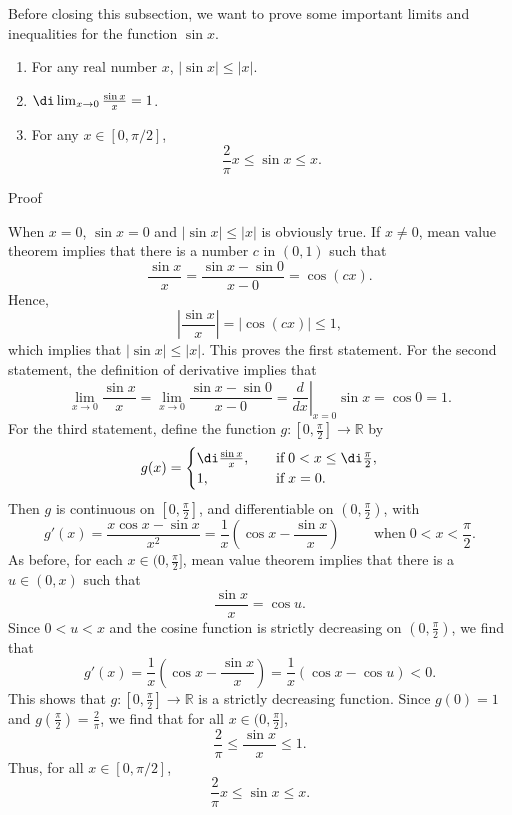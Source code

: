 Before closing this subsection, we want to prove some important limits and  inequalities for the function $\sin x$.
\begin{theorem}[label=230307_8]{}
\begin{enumerate}[1.]
\item
For any real number $x$, $|\sin x|\leq |x|$.
\item $\di \lim_{x\to 0}\frac{\sin x}{x}=1$.
\item For any $x\in [0, \pi/2]$, 
\[\frac{2}{\pi}x\leq \sin x \leq x.\]
\end{enumerate}
\end{theorem}
\begin{myproof}{Proof}
 
When $x=0$, $\sin x=0$ and $|\sin x|\leq |x|$ is obviously true. If $x\neq 0$, mean value theorem implies that there is a number $c$ in $(0,1)$ such that
\begin{equation}\label{eq230218_9}\frac{\sin x}{x}=\frac{\sin x-\sin 0}{x-0}=\cos (cx).\end{equation}
Hence, \[\left|\frac{\sin x}{x}\right|=|\cos (cx)|\leq 1,\]which implies that $|\sin x|\leq |x|$. This proves the first statement.\bp
For the second statement, the definition of derivative implies that
\begin{equation*}\lim_{x\to 0}\frac{\sin x}{x}=\lim_{x\to 0}\frac{\sin x-\sin 0}{x-0}=\left.\frac{d}{dx}\right|_{x=0}\sin x=\cos 0=1.\end{equation*}
  For the third statement, define the function $g:[0,\frac{\pi}{2}]\to\mathbb{R}$ by
\[g(x)=\begin{cases}\di\frac{\sin x}{x},\quad &\text{if}\;0<x\leq\di\frac{\pi}{2},\\1,\quad &\text{if}\;x=0.\end{cases}\]Then $g$ is continuous on $[0, \frac{\pi}{2}]$, and differentiable on $(0, \frac{\pi}{2})$, with
\[g'(x)=\frac{x\cos x-\sin x}{x^2}=\frac{1}{x}\left(\cos x-\frac{\sin x}{x}\right)\hspace{1cm}\text{when}\;0<x<\frac{\pi}{2}.\]
As before, for each $x\in (0, \frac{\pi}{2}]$, mean value theorem implies that there is a $u\in (0, x)$ such that
\[\frac{\sin x}{x}=\cos u.\]
Since $0<u<x$ and the cosine function is strictly decreasing on $(0, \frac{\pi}{2})$, we find that
\[g'(x)=\frac{1}{x}\left(\cos x-\frac{\sin x}{x}\right)=\frac{1}{x}\left(\cos x-\cos u\right)<0.\]
This shows that $g:[0,\frac{\pi}{2}]\to\mathbb{R}$ is a strictly decreasing function. Since $g(0)=1$ and $g(\frac{\pi}{2})=\frac{2}{\pi}$, we find that for all $x\in (0, \frac{\pi}{2}]$,
\[\frac{2}{\pi}\leq\frac{\sin x}{x}\leq 1.\]
Thus, for all $x\in [0, \pi/2]$, 
\[\frac{2}{\pi}x\leq \sin x \leq x.\]

\end{myproof}



